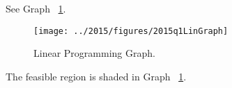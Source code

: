 \begin{subquestions}
\begin{subsubquestions}
\begin{subsubsubquestions}
\end{subsubsubquestions}


\subsubquestion

\begin{subsubsubquestions}

	
\subsubsubquestion

See Graph ~\ref{2015:q1:graph:Graph1}.

\begin{figure}
	\begin{center}
		\texttt{[image: ../2015/figures/2015q1LinGraph]}
		\caption{\label{2015:q1:graph:Graph1} Linear Programming Graph.}
	\end{center}
\end{figure}


\subsubsubquestion

The feasible region is shaded in Graph ~\ref{2015:q1:graph:Graph1}.

\end{subsubsubquestions}


\subsubquestion

\begin{subsubsubquestions}
	


\end{subsubsubquestions}
\end{subsubquestions}
\end{subquestions}
